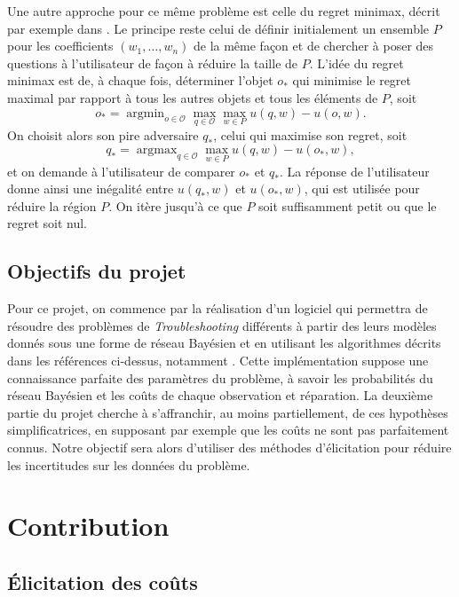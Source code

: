 \documentclass[a4paper,11pt]{article}
\theoremstyle{plain}
\DeclareMathOperator*{\argmax}{argmax}
\DeclareMathOperator*{\argmin}{argmin}
\begin{document}
Une autre approche pour ce même problème est celle du regret minimax, décrit par exemple dans \cite{Boutilier2006Constraint}. Le principe reste celui de définir initialement un ensemble $P$ pour les coefficients $(w_1, \dotsc,\allowbreak w_n)$ de la même façon et de chercher à poser des questions à l'utilisateur de façon à réduire la taille de $P$. L'idée du regret minimax est de, à chaque fois, déterminer l'objet $o_{\ast}$ qui minimise le regret maximal par rapport à tous les autres objets et tous les éléments de $P$, soit
\[o_{\ast} = \argmin_{o \in \mathcal O} \max_{q \in \mathcal O} \max_{w \in P} u(q, w) - u(o, w).\]
On choisit alors son pire adversaire $q_\ast$, celui qui maximise son regret, soit
\[q_{\ast} = \argmax_{q \in \mathcal O} \max_{w \in P} u(q, w) - u(o_\ast, w),\]
et on demande à l'utilisateur de comparer $o_\ast$ et $q_\ast$. La réponse de l'utilisateur donne ainsi une inégalité entre $u(q_\ast, w)$ et $u(o_\ast, w)$, qui est utilisée pour réduire la région $P$. On itère jusqu'à ce que $P$ soit suffisamment petit ou que le regret soit nul.

\subsection{Objectifs du projet}

Pour ce projet, on commence par la réalisation d'un logiciel qui permettra de résoudre des problèmes de \emph{Troubleshooting} différents à partir des leurs modèles donnés sous une forme de réseau Bayésien et en utilisant les algorithmes décrits dans les références ci-dessus, notamment \cite{Heckerman_1995, heckerman1994troubleshooting}. Cette implémentation suppose une connaissance parfaite des paramètres du problème, à savoir les probabilités du réseau Bayésien et les coûts de chaque observation et réparation. La deuxième partie du projet cherche à s'affranchir, au moins partiellement, de ces hypothèses simplificatrices, en supposant par exemple que les coûts ne sont pas parfaitement connus. Notre objectif sera alors d'utiliser des méthodes d'élicitation pour réduire les incertitudes sur les données du problème.

\section{Contribution}
\label{SecContribution}

\subsection{Élicitation des coûts}
\end{document}

